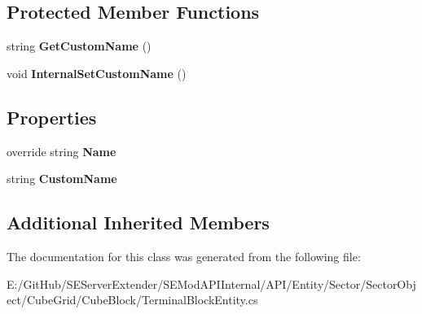 \subsection*{Protected Member Functions}
\begin{DoxyCompactItemize}
\item 
\hypertarget{class_s_e_mod_a_p_i_internal_1_1_a_p_i_1_1_entity_1_1_sector_1_1_sector_object_1_1_cube_grid_1_120546f0333a2c3c0991eba1a19f6100c_a6eede3ac996786c3c13fbc82e677c29f}{}string {\bfseries Get\+Custom\+Name} ()\label{class_s_e_mod_a_p_i_internal_1_1_a_p_i_1_1_entity_1_1_sector_1_1_sector_object_1_1_cube_grid_1_120546f0333a2c3c0991eba1a19f6100c_a6eede3ac996786c3c13fbc82e677c29f}

\item 
\hypertarget{class_s_e_mod_a_p_i_internal_1_1_a_p_i_1_1_entity_1_1_sector_1_1_sector_object_1_1_cube_grid_1_120546f0333a2c3c0991eba1a19f6100c_a81df9f3d448d6cd0196893e7d4740025}{}void {\bfseries Internal\+Set\+Custom\+Name} ()\label{class_s_e_mod_a_p_i_internal_1_1_a_p_i_1_1_entity_1_1_sector_1_1_sector_object_1_1_cube_grid_1_120546f0333a2c3c0991eba1a19f6100c_a81df9f3d448d6cd0196893e7d4740025}

\end{DoxyCompactItemize}
\subsection*{Properties}
\begin{DoxyCompactItemize}
\item 
\hypertarget{class_s_e_mod_a_p_i_internal_1_1_a_p_i_1_1_entity_1_1_sector_1_1_sector_object_1_1_cube_grid_1_120546f0333a2c3c0991eba1a19f6100c_a92719af7862042df04ce9349e9ec7131}{}override string {\bfseries Name}\label{class_s_e_mod_a_p_i_internal_1_1_a_p_i_1_1_entity_1_1_sector_1_1_sector_object_1_1_cube_grid_1_120546f0333a2c3c0991eba1a19f6100c_a92719af7862042df04ce9349e9ec7131}

\item 
\hypertarget{class_s_e_mod_a_p_i_internal_1_1_a_p_i_1_1_entity_1_1_sector_1_1_sector_object_1_1_cube_grid_1_120546f0333a2c3c0991eba1a19f6100c_a83f88dc0d77b818e1d8bc9d904904c69}{}string {\bfseries Custom\+Name}\label{class_s_e_mod_a_p_i_internal_1_1_a_p_i_1_1_entity_1_1_sector_1_1_sector_object_1_1_cube_grid_1_120546f0333a2c3c0991eba1a19f6100c_a83f88dc0d77b818e1d8bc9d904904c69}

\end{DoxyCompactItemize}
\subsection*{Additional Inherited Members}


The documentation for this class was generated from the following file\+:\begin{DoxyCompactItemize}
\item 
E\+:/\+Git\+Hub/\+S\+E\+Server\+Extender/\+S\+E\+Mod\+A\+P\+I\+Internal/\+A\+P\+I/\+Entity/\+Sector/\+Sector\+Object/\+Cube\+Grid/\+Cube\+Block/Terminal\+Block\+Entity.\+cs\end{DoxyCompactItemize}
